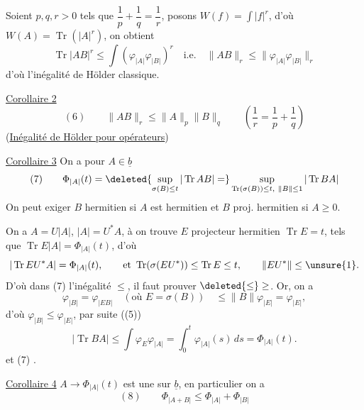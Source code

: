 Soient $p,q,r>0$ tels que $\dfrac1p+\dfrac1q=\dfrac1r$, posons
$W(f)=\int|f|^r$,  d'où
 $W(A)=\operatorname{Tr}(|A|^r)$,
on obtient
\[
\operatorname{Tr}|AB|^r\leq\int(\varphi_{|A|}\varphi_{|B|})^r
\quad\text{i.e.}\quad
\|AB\|_r\leq\|\varphi_{|A|}\varphi_{|B|}\|_r
\]
 d'où  l'inégalité de Hölder classique.

\uline{Corollaire 2}
\[
(6)\qquad\|AB\|_r\leq\|A\|_p\|B\|_q
\qquad\left(\frac1r=\frac1p+\frac1q\right)
\]
 (\uline{Inégalité de Hölder pour opérateurs})

\uline{Corollaire 3} 
On a pour $A\in\underline b$ 
\[
(7)\qquad\Phi_{|A|}(t)=
\deleted{\sup_{\sigma(B)\leq t}|\operatorname{Tr}AB|=}
\sup_{\operatorname{Tr}(\sigma(B))\leq t,\ \|B\|\leq1}|\operatorname{Tr}BA|
\]
On peut exiger $B$  hermitien  si $A$ est hermitien
et $B$ proj. hermitien si $A\geq0$.

 On a $A=U|A|$, $|A|=U^*A$,  à   on trouve $E$ projecteur hermitien
$\operatorname{Tr}E=t$, tels que $\operatorname{Tr}E|A|=\Phi_{|A|}(t)$, d'où
\[
|\operatorname{Tr}EU^*A|=\Phi_{|A|}(t),\qquad
\text{et }\operatorname{Tr}(\sigma(EU^*))\leq\operatorname{Tr}E\leq t,
\qquad \|EU^*\|\leq\unsure{1}.
\]
D'où dans (7) l'inégalité $\leq$, il faut prouver $\deleted{\leq}\geq$.
Or, on a 
\[
\varphi_{|B|}=\varphi_{|EB|}
\quad(\text{où }E=\sigma(B))\quad
\leq\|B\|\varphi_{|E|}=\varphi_{|E|},
\]
d'où $\varphi_{|B|}\leq\varphi_{|E|}$, par suite ((5))
\[
|\operatorname{Tr}BA|\leq\int\varphi_E\varphi_{|A|}
=\int_0^t\varphi_{|A|}(s)\,ds=\Phi_{|A|}(t).
\]
et (7) .

\uline{Corollaire 4} 
$A\to\Phi_{|A|}(t)$ est une  sur $\underline b$,
en  particulier on a
\[
(8)\qquad\Phi_{|A+B|}\leq\Phi_{|A|}+\Phi_{|B|}
\]


